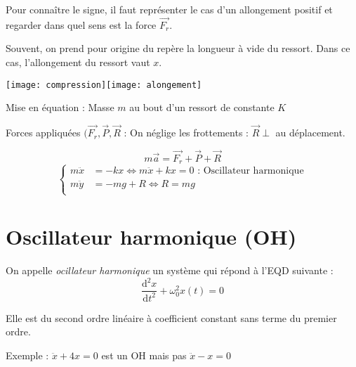 \documentclass[french]{yLectureNote}
\renewcommand{\vec}{\overrightarrow}
\begin{document}
Pour connaître le signe, il faut représenter le cas d'un allongement positif et regarder dans quel sens est la force $\vec{F_r}$.

Souvent, on prend pour origine du repère la longueur à vide du ressort. Dans ce cas, l'allongement du ressort vaut $x$.

\texttt{[image: compression]}\:\texttt{[image: alongement]}

Mise en équation : Masse $m$ au  bout d'un ressort de constante $K$

Forces appliquées $(\vec{F_r},\vec{P},\vec{R}$ : On néglige les frottements : $\vec{R}\perp$ au déplacement.

\[m\vec{a} = \vec{F_r}+\vec{P}+\vec{R}\]
\[\left\{\begin{matrix}
 m\ddot{x} &= -kx \iff m\ddot{x} + kx = 0 \text{ : Oscillateur harmonique}\\
 m\ddot{y} &= -mg+R \iff R = mg\\
\end{matrix}\right.\]
\section{Oscillateur harmonique (OH)}
On appelle \emph{ocillateur harmonique} un système qui répond à l'EQD suivante :
\[\frac{\mathrm{d}^2x}{\mathrm{d}t^2}+ \omega_0^2x(t) = 0\]

Elle est du second ordre linéaire à coefficient constant sans terme du premier ordre.

Exemple : $\ddot{x}+4x = 0$ est un OH mais pas $\ddot{x}-x=0$

\end{document}
